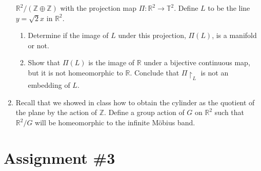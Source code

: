 \documentclass[notoc,notitlepage]{tufte-book}
\begin{document}
\begin{enumerate}
    $\mathbb{R}^2 / (\mathbb{Z} \oplus \mathbb{Z})$ with the projection map
    $\Pi : \mathbb{R}^2 \to \mathbb{T}^2$. Define $L$ to be the line $y = \sqrt{2}x$ in
    $\mathbb{R}^2$.
    \begin{enumerate}
      \item Determine if the image of $L$ under this projection, $\Pi(L)$, is a
        manifold or not.
      \item Show that $\Pi(L)$ is the image of $\mathbb{R}$ under a bijective continuous
        map, but it is not homeomorphic to $\mathbb{R}$. Conclude that $\Pi \restriction_{L}$
        is not an embedding of $L$.
    \end{enumerate}
  \item Recall that we showed in class how to obtain the cylinder as the quotient of the
    plane by the action of $\mathbb{Z}$. Define a group action of $G$ on $\mathbb{R}^2$
    such that $\mathbb{R}^2 / G$ will be homeomorphic to the infinite M\"{o}bius band.
\end{enumerate}


\newpage

\section{Assignment \#3}%
\label{sec:assignment_3}
\end{document}
